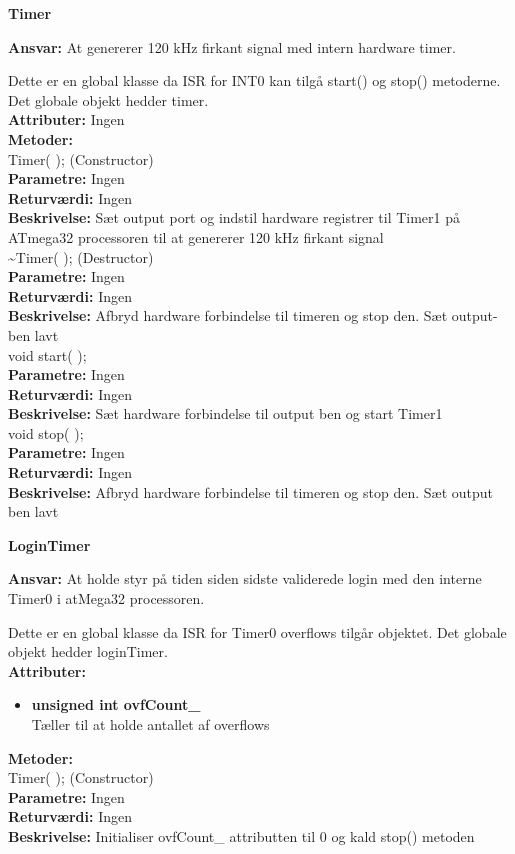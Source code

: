 %
%
{\centering
\textbf{Timer}\par
}
\textbf{Ansvar:} At genererer 120 kHz firkant signal med intern hardware timer.

Dette er en global klasse da ISR for INT0 kan tilgå start() og stop() metoderne. Det globale objekt hedder timer. \\
\textbf{Attributer:} Ingen \\
\textbf{Metoder:} \\
Timer( ); (Constructor) \\
\textbf{Parametre:} Ingen \\
\textbf{Returværdi:} Ingen \\
\textbf{Beskrivelse:} Sæt output port og indstil hardware registrer til Timer1 på ATmega32 processoren til at genererer 120 kHz firkant signal \\

\textasciitilde Timer( ); (Destructor) \\
\textbf{Parametre:} Ingen \\
\textbf{Returværdi:} Ingen \\
\textbf{Beskrivelse:} Afbryd hardware forbindelse til timeren og stop den. Sæt output-ben lavt \\

void start( ); \\
\textbf{Parametre:} Ingen \\
\textbf{Returværdi:} Ingen \\
\textbf{Beskrivelse:} Sæt hardware forbindelse til output ben og start Timer1 \\

void stop( ); \\
\textbf{Parametre:} Ingen \\
\textbf{Returværdi:} Ingen \\
\textbf{Beskrivelse:} Afbryd hardware forbindelse til timeren og stop den. Sæt output ben lavt \\

%
%
{\centering
\textbf{LoginTimer}\par
}
\textbf{Ansvar:} At holde styr på tiden siden sidste validerede login med den interne Timer0 i atMega32 processoren.

Dette er en global klasse da ISR for Timer0 overflows tilgår objektet. Det globale objekt hedder loginTimer. \\
\textbf{Attributer:}
\begin{itemize}
	\item \textbf{unsigned int ovfCount\_} \\
	Tæller til at holde antallet af overflows
\end{itemize}
\textbf{Metoder:} \\
Timer( ); (Constructor) \\
\textbf{Parametre:} Ingen \\
\textbf{Returværdi:} Ingen \\
\textbf{Beskrivelse:} Initialiser ovfCount\_ attributten til 0 og kald stop() metoden \\

